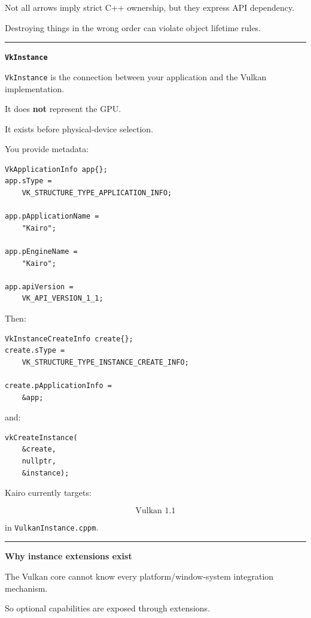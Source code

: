 Not all arrows imply strict C++ ownership, but they express API dependency.

Destroying things in the wrong order can violate object lifetime rules.

\begin{center}\rule{0.5\linewidth}{0.5pt}\end{center}

\textbf{\texttt{VkInstance}}

\texttt{VkInstance} is the connection between your application and the Vulkan implementation.

It does \textbf{not} represent the GPU.

It exists before physical-device selection.

You provide metadata:

\begin{verbatim}
VkApplicationInfo app{};
app.sType =
    VK_STRUCTURE_TYPE_APPLICATION_INFO;

app.pApplicationName =
    "Kairo";

app.pEngineName =
    "Kairo";

app.apiVersion =
    VK_API_VERSION_1_1;
\end{verbatim}

Then:

\begin{verbatim}
VkInstanceCreateInfo create{};
create.sType =
    VK_STRUCTURE_TYPE_INSTANCE_CREATE_INFO;

create.pApplicationInfo =
    &app;
\end{verbatim}

and:

\begin{verbatim}
vkCreateInstance(
    &create,
    nullptr,
    &instance);
\end{verbatim}

Kairo currently targets:

\[
\boxed{\text{Vulkan 1.1}}
\]

in \texttt{VulkanInstance.cppm}.

\begin{center}\rule{0.5\linewidth}{0.5pt}\end{center}

\textbf{Why instance extensions exist}

The Vulkan core cannot know every platform/window-system integration mechanism.

So optional capabilities are exposed through extensions.

